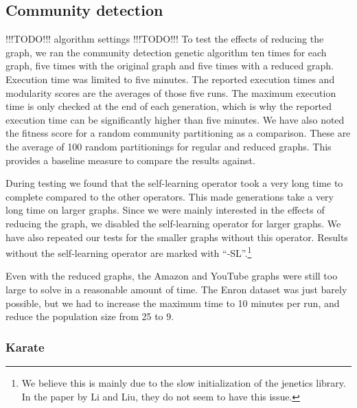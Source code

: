 \subsection{Community detection}
!!!TODO!!! algorithm settings !!!TODO!!!
To test the effects of reducing the graph, we ran the community detection genetic algorithm ten times for each graph, five times with the original graph and five times with a reduced graph. Execution time was limited to five minutes. The reported execution times and modularity scores are the averages of those five runs. The maximum execution time is only checked at the end of each generation, which is why the reported execution time can be significantly higher than five minutes. We have also noted the fitness score for a random community partitioning as a comparison. These are the average of 100 random partitionings for regular and reduced graphs. This provides a baseline measure to compare the results against.
\par
During testing we found that the self-learning operator took a very long time to complete compared to the other operators. This made generations take a very long time on larger graphs. Since we were mainly interested in the effects of reducing the graph, we disabled the self-learning operator for larger graphs. We have also repeated our tests for the smaller graphs without this operator. Results without the self-learning operator are marked with ``-SL''.\footnote{We believe this is mainly due to the slow initialization of the jenetics library. In the paper by Li and Liu, they do not seem to have this issue. }
\par
Even with the reduced graphs, the Amazon and YouTube graphs were still too large to solve in a reasonable amount of time. The Enron dataset was just barely possible, but we had to increase the maximum time to 10 minutes per run, and reduce the population size from 25 to 9.

\subsubsection{Karate}

